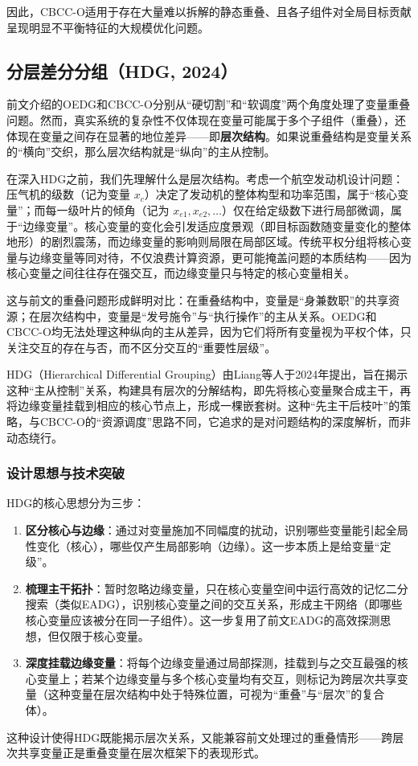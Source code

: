 因此，CBCC-O适用于存在大量难以拆解的静态重叠、且各子组件对全局目标贡献呈现明显不平衡特征的大规模优化问题。

\subsection{分层差分分组（HDG, 2024）}

前文介绍的OEDG和CBCC-O分别从“硬切割”和“软调度”两个角度处理了变量重叠问题。然而，真实系统的复杂性不仅体现在变量可能属于多个子组件（重叠），还体现在变量之间存在显著的地位差异——即\textbf{层次结构}。如果说重叠结构是变量关系的“横向”交织，那么层次结构就是“纵向”的主从控制。

在深入HDG之前，我们先理解什么是层次结构。考虑一个航空发动机设计问题：压气机的级数（记为变量 $x_c$）决定了发动机的整体构型和功率范围，属于“核心变量”；而每一级叶片的倾角（记为 $x_{e1}, x_{e2}, \dots$）仅在给定级数下进行局部微调，属于“边缘变量”。核心变量的变化会引发适应度景观（即目标函数随变量变化的整体地形）的剧烈震荡，而边缘变量的影响则局限在局部区域。传统平权分组将核心变量与边缘变量等同对待，不仅浪费计算资源，更可能掩盖问题的本质结构——因为核心变量之间往往存在强交互，而边缘变量只与特定的核心变量相关。

这与前文的重叠问题形成鲜明对比：在重叠结构中，变量是“身兼数职”的共享资源；在层次结构中，变量是“发号施令”与“执行操作”的主从关系。OEDG和CBCC-O均无法处理这种纵向的主从差异，因为它们将所有变量视为平权个体，只关注交互的存在与否，而不区分交互的“重要性层级”。

HDG（Hierarchical Differential Grouping）由Liang等人于2024年提出，旨在揭示这种“主从控制”关系，构建具有层次的分解结构，即先将核心变量聚合成主干，再将边缘变量挂载到相应的核心节点上，形成一棵嵌套树。这种“先主干后枝叶”的策略，与CBCC-O的“资源调度”思路不同，它追求的是对问题结构的深度解析，而非动态绕行。

\subsubsection{设计思想与技术突破}
HDG的核心思想分为三步：
\begin{enumerate}
    \item \textbf{区分核心与边缘}：通过对变量施加不同幅度的扰动，识别哪些变量能引起全局性变化（核心），哪些仅产生局部影响（边缘）。这一步本质上是给变量“定级”。
    \item \textbf{梳理主干拓扑}：暂时忽略边缘变量，只在核心变量空间中运行高效的记忆二分搜索（类似EADG），识别核心变量之间的交互关系，形成主干网络（即哪些核心变量应该被分在同一子组件）。这一步复用了前文EADG的高效探测思想，但仅限于核心变量。
    \item \textbf{深度挂载边缘变量}：将每个边缘变量通过局部探测，挂载到与之交互最强的核心变量上；若某个边缘变量与多个核心变量均有交互，则标记为跨层次共享变量（这种变量在层次结构中处于特殊位置，可视为“重叠”与“层次”的复合体）。
\end{enumerate}
这种设计使得HDG既能揭示层次关系，又能兼容前文处理过的重叠情形——跨层次共享变量正是重叠变量在层次框架下的表现形式。

